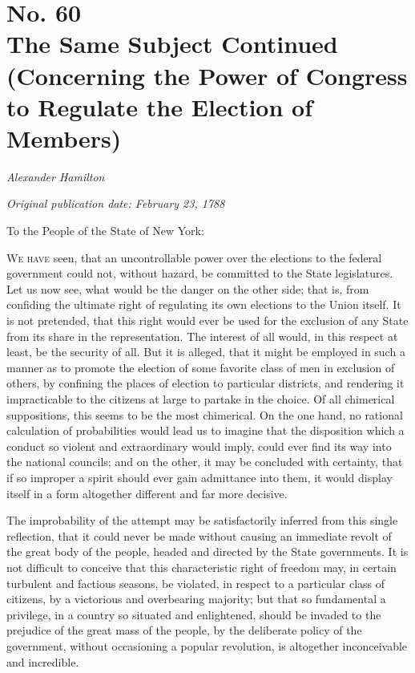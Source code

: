 \chapter[No. 60: The Same Subject Continued (Concerning the Power of Congress to Regulate the Election of Members)]{No. 60\\ {\small The Same Subject Continued (Concerning the Power of Congress to Regulate the Election of Members)}}

\textit{Alexander Hamilton}

\textit{Original publication date: February 23, 1788}
\vspace{1cm}

To the People of the State of New York:
\vspace{.4cm}

\textsc{We have} seen, that an uncontrollable power over the elections to the federal government could not, without hazard, be committed to the State legislatures. 
Let us now see, what would be the danger on the other side; that is, from confiding the ultimate right of regulating its own elections to the Union itself. 
It is not pretended, that this right would ever be used for the exclusion of any State from its share in the representation. 
The interest of all would, in this respect at least, be the security of all. 
But it is alleged, that it might be employed in such a manner as to promote the election of some favorite class of men in exclusion of others, by confining the places of election to particular districts, and rendering it impracticable to the citizens at large to partake in the choice. 
Of all chimerical suppositions, this seems to be the most chimerical. 
On the one hand, no rational calculation of probabilities would lead us to imagine that the disposition which a conduct so violent and extraordinary would imply, could ever find its way into the national councils; and on the other, it may be concluded with certainty, that if so improper a spirit should ever gain admittance into them, it would display itself in a form altogether different and far more decisive.

The improbability of the attempt may be satisfactorily inferred from this single reflection, that it could never be made without causing an immediate revolt of the great body of the people, headed and directed by the State governments. 
It is not difficult to conceive that this characteristic right of freedom may, in certain turbulent and factious seasons, be violated, in respect to a particular class of citizens, by a victorious and overbearing majority; but that so fundamental a privilege, in a country so situated and enlightened, should be invaded to the prejudice of the great mass of the people, by the deliberate policy of the government, without occasioning a popular revolution, is altogether inconceivable and incredible.


